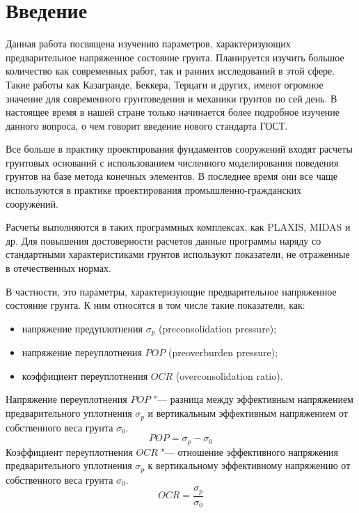 \chapter*{Введение}                         %

Данная работа посвящена изучению параметров, характеризующих предварительное напряженное состояние грунта. Планируется изучить большое количество как современных работ, так и ранних исследований в этой сфере. Такие работы как Казагранде, Беккера, Терцаги и других, имеют огромное значение для современного грунтоведения и механики грунтов по сей день.
В настоящее время в нашей стране только начинается более подробное изучение данного вопроса, о чем говорит введение нового стандарта ГОСТ. 

Все больше в практику проектирования фундаментов сооружений входят расчеты грунтовых оснований с использованием численного моделирования поведения грунтов на базе метода конечных элементов. 
В последнее время они все чаще используются в практике проектирования промышленно-гражданских сооружений. 

Расчеты выполняются в таких программных комплексах, как PLAXIS, MIDAS и др. 
Для повышения достоверности расчетов данные программы наряду со стандартными характеристиками грунтов используют показатели, не отраженные в отечественных нормах. 

В частности, это параметры, характеризующие предварительное напряженное состояние грунта. 
К ним относятся в том числе такие показатели, как:
\begin{itemize}
    \item напряжение предуплотнения $\sigma_p$ (preconsolidation pressure);
    \item напряжение переуплотнения $POP$ (preoverburden pressure);
    \item коэффициент переуплотнения $OCR$ (overconsolidation ratio).
\end{itemize}

Напряжение переуплотнения $POP$ "--- разница между эффективным напряжением предвари­тельного уплотнения $\sigma_p$ и вертикальным эффективным напряжением от собственного веса грунта $\sigma_0$.
\begin{equation}
    \label{eq:pop}
    POP = \sigma_p - \sigma_0
\end{equation}
Коэффициент переуплотнения $OCR$ "---  отношение эффективного напряжения предваритель­ного уплотнения $\sigma_p$ к вертикальному эффективному напряжению от собственного веса грунта $\sigma_0$.
\begin{equation}
    \label{eq:ocr}
    OCR = \frac{\sigma_p}{\sigma_0}
\end{equation}

